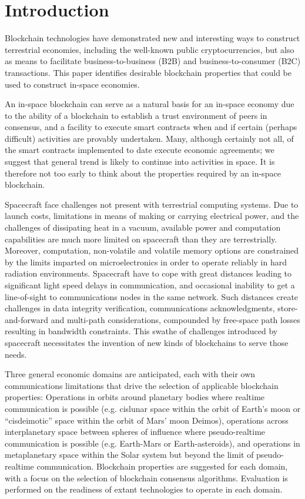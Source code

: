 \documentclass[journal ]{new-aiaa}
\begin{document}
\section{Introduction}

Blockchain technologies have demonstrated new and interesting ways to construct terrestrial economies, including the well-known public cryptocurrencies, but also as means to facilitate business-to-business (B2B) and business-to-consumer (B2C) transactions. This paper identifies desirable blockchain properties that could be used to construct in-space economies.

An in-space blockchain can serve as a natural basis for an in-space economy due to the ability of a blockchain to establish a trust environment of peers in consensus, and a facility to execute smart contracts when and if certain (perhaps difficult) activities are provably undertaken. Many, although certainly not all, of the smart contracts implemented to date execute economic agreements; we suggest that general trend is likely to continue into activities in space. It is therefore not too early to think about the properties required by an in-space blockchain.

Spacecraft face challenges not present with terrestrial computing systems. Due to launch costs, limitations in means of making or carrying electrical power, and the challenges of dissipating heat in a vacuum, available power and computation capabilities are much more limited on spacecraft than they are terrestrially. Moreover, computation, non-volatile and volatile memory options are constrained by the limits imparted on microelectronics in order to operate reliably in hard radiation environments.  Spacecraft have to cope with great distances leading to significant light speed delays in communication, and occasional inability to get a line-of-sight to communications nodes in the same network.  Such distances create challenges in data integrity verification, communications acknowledgments, store-and-forward and multi-path considerations, compounded by free-space path losses resulting in bandwidth constraints. This swathe of challenges introduced by spacecraft necessitates the invention of new kinds of blockchains to serve those needs.

Three general economic domains are anticipated, each with their own communications limitations that drive the selection of applicable blockchain properties: Operations in orbits around planetary bodies where realtime communication is possible (e.g. cislunar space within the orbit of Earth's moon or ``cisdeimotic'' space within the orbit of Mars' moon Deimos), operations across interplanetary space between spheres of influence where pseudo-realtime communication is possible (e.g. Earth-Mars or Earth-asteroids), and operations in metaplanetary space within the Solar system but beyond the limit of pseudo-realtime communication. Blockchain properties are suggested for each domain, with a focus on the selection of blockchain consensus algorithms. Evaluation is performed on the readiness of extant technologies to operate in each domain.
\end{document}
